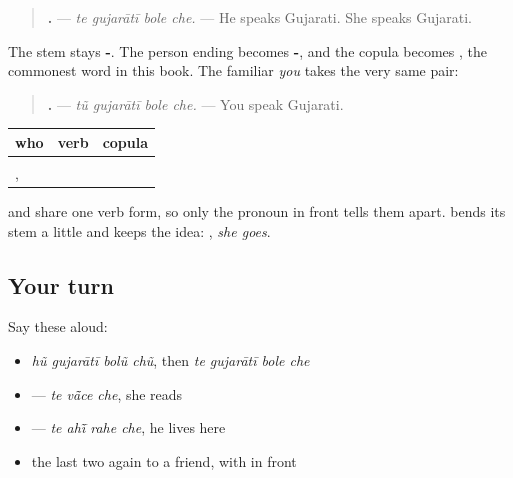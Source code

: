 \begin{grammarlens}[title={Grammar Lens: one ending for he, she and \gu{તું}}]
\begin{quote}
\textbf{   .} — \emph{te gujarātī bole che.} — He speaks Gujarati. She speaks Gujarati.
\end{quote}

The stem stays \textbf{-}. The person ending becomes \textbf{-}, and the copula becomes \textbf{}, the commonest word in this book. The familiar \emph{you} takes the very same pair:

\begin{quote}
\textbf{   .} — \emph{tũ gujarātī bole che.} — You speak Gujarati.
\end{quote}

\noindent
\begin{tabularx}{\linewidth}{@{}>{\raggedright\arraybackslash}X>{\raggedright\arraybackslash}X>{\raggedright\arraybackslash}X@{}}
\toprule
\textbf{who} & \textbf{verb} & \textbf{copula} \\
\midrule
\gu{હું} & \gu{બોલું} & \gu{છું} \\
\gu{તું}, \gu{તે} & \gu{બોલે} & \gu{છે} \\
\bottomrule
\end{tabularx}

\textbf{} and \textbf{} share one verb form, so only the pronoun in front tells them apart. \textbf{} bends its stem a little and keeps the idea: \textbf{  }, \emph{she goes}.
\end{grammarlens}

\subsection*{Your turn}
Say these aloud:

\begin{itemize}
\raggedright
  \item \emph{hũ gujarātī bolũ chũ}, then \emph{te gujarātī bole che}
  \item \textbf{  } — \emph{te vā̃ce che}, she reads
  \item \textbf{   } — \emph{te ahī̃ rahe che}, he lives here
  \item the last two again to a friend, with \textbf{} in front
\end{itemize}

